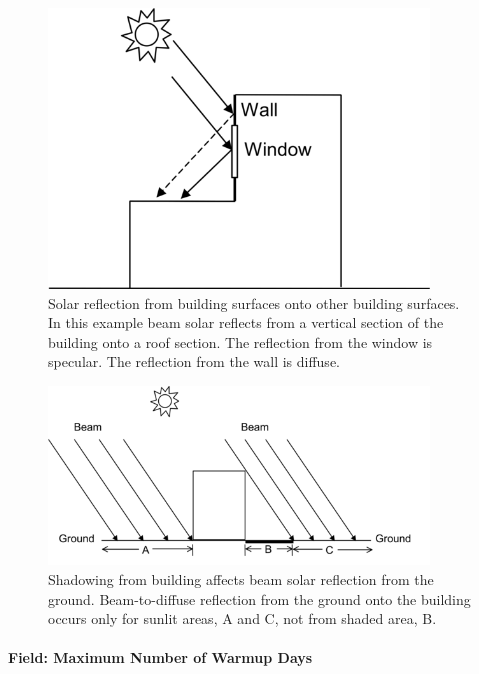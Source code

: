 \begin{figure}[hbtp] %
\centering
\includegraphics[width=0.9\textwidth, height=0.9\textheight, keepaspectratio=true]{media/image004.png}
\caption{  Solar reflection from building surfaces onto other building surfaces. In this example beam solar reflects from a vertical section of the building onto a roof section. The reflection from the window is specular. The reflection from the wall is diffuse. \protect \label{fig:solar-reflection-from-building-surfaces-onto}}
\end{figure}

\begin{figure}[hbtp] %
\centering
\includegraphics[width=0.9\textwidth, height=0.9\textheight, keepaspectratio=true]{media/image005.png}
\caption{Shadowing from building affects beam solar reflection from the ground. Beam-to-diffuse reflection from the ground onto the building occurs only for sunlit areas, A and C, not from shaded area, B. \protect \label{fig:shadowing-from-building-affects-beam-solar}}
\end{figure}

\paragraph{Field: Maximum Number of Warmup Days}\label{field-maximum-number-of-warmup-days}

